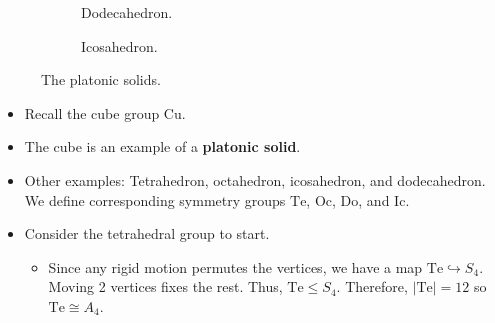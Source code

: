 \documentclass[../notes.tex]{subfiles}
\begin{document}
\begin{itemize}
\begin{figure}[h!]
\begin{subfigure}[b]{0.19\linewidth}
            \caption{Dodecahedron.}
            \label{fig:platonicSolidsd}
        \end{subfigure}
        \begin{subfigure}[b]{0.19\linewidth}
            \centering
            \caption{Icosahedron.}
            \label{fig:platonicSolidse}
        \end{subfigure}
        \caption{The platonic solids.}
        \label{fig:platonicSolids}
    \end{figure}
    \begin{itemize}
        \item Recall the cube group $\text{Cu}$.
        \item The cube is an example of a \textbf{platonic solid}.
        \item Other examples: Tetrahedron, octahedron, icosahedron, and dodecahedron. We define corresponding symmetry groups $\text{Te}$, $\text{Oc}$, $\text{Do}$, and $\text{Ic}$.
        \item Consider the tetrahedral group to start.
        \begin{itemize}
            \item Since any rigid motion permutes the vertices, we have a map $\text{Te}\hookrightarrow S_4$. Moving 2 vertices fixes the rest. Thus, $\text{Te}\leq S_4$. Therefore, $|\text{Te}|=12$ so $\text{Te}\cong A_4$.

\end{itemize}
\end{itemize}
\end{itemize}
\end{document}

